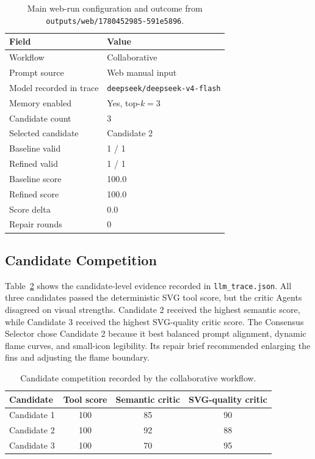 \documentclass[10pt]{article}
\newcommand{\rundir}{\texttt{outputs/web/1780452985-591e5896}}
\begin{document}
\begin{table}[t]
\centering
\caption{Main web-run configuration and outcome from \rundir.}
\label{tab:main}
\begin{tabular}{ll}
\toprule
Field & Value \\
\midrule
Workflow & Collaborative \\
Prompt source & Web manual input \\
Model recorded in trace & \texttt{deepseek/deepseek-v4-flash} \\
Memory enabled & Yes, top-$k=3$ \\
Candidate count & 3 \\
Selected candidate & Candidate 2 \\
Baseline valid & 1 / 1 \\
Refined valid & 1 / 1 \\
Baseline score & 100.0 \\
Refined score & 100.0 \\
Score delta & 0.0 \\
Repair rounds & 0 \\
\bottomrule
\end{tabular}
\end{table}

\subsection{Candidate Competition}

Table~\ref{tab:candidates} shows the candidate-level evidence recorded in \texttt{llm\_trace.json}. All three candidates passed the deterministic SVG tool score, but the critic Agents disagreed on visual strengths. Candidate 2 received the highest semantic score, while Candidate 3 received the highest SVG-quality critic score. The Consensus Selector chose Candidate 2 because it best balanced prompt alignment, dynamic flame curves, and small-icon legibility. Its repair brief recommended enlarging the fins and adjusting the flame boundary.

\begin{table}[t]
\centering
\caption{Candidate competition recorded by the collaborative workflow.}
\label{tab:candidates}
\begin{tabular}{lccc}
\toprule
Candidate & Tool score & Semantic critic & SVG-quality critic \\
\midrule
Candidate 1 & 100 & 85 & 90 \\
Candidate 2 & 100 & 92 & 88 \\
Candidate 3 & 100 & 70 & 95 \\
\bottomrule
\end{tabular}
\end{table}
\end{document}

